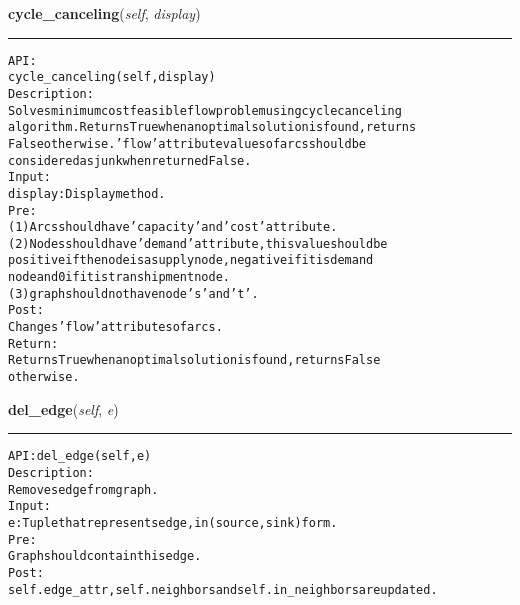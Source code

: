     \label{coinor:gimpy:graph:Graph:cycle_canceling}

    \vspace{0.5ex}

\hspace{.8\funcindent}\begin{boxedminipage}{\funcwidth}

    \raggedright \textbf{cycle\_canceling}(\textit{self}, \textit{display})

    \vspace{-1.5ex}

    \rule{\textwidth}{0.5\fboxrule}
\setlength{\parskip}{2ex}
\begin{alltt}

API:
    cycle\_canceling(self, display)
Description:
    Solves minimum cost feasible flow problem using cycle canceling
    algorithm. Returns True when an optimal solution is found, returns
    False otherwise. 'flow' attribute values of arcs should be
    considered as junk when returned False.
Input:
    display: Display method.
Pre:
    (1) Arcs should have 'capacity' and 'cost' attribute.
    (2) Nodes should have 'demand' attribute, this value should be
    positive if the node is a supply node, negative if it is demand
    node and 0 if it is transhipment node.
    (3) graph should not have node 's' and 't'.
Post:
    Changes 'flow' attributes of arcs.
Return:
    Returns True when an optimal solution is found, returns False
    otherwise.
\end{alltt}

\setlength{\parskip}{1ex}
    \end{boxedminipage}

    \label{coinor:gimpy:graph:Graph:del_edge}

    \vspace{0.5ex}

\hspace{.8\funcindent}\begin{boxedminipage}{\funcwidth}

    \raggedright \textbf{del\_edge}(\textit{self}, \textit{e})

    \vspace{-1.5ex}

    \rule{\textwidth}{0.5\fboxrule}
\setlength{\parskip}{2ex}
\begin{alltt}

API: del\_edge(self, e)
Description:
Removes edge from graph.
Input:
    e: Tuple that represents edge, in (source,sink) form.
Pre:
    Graph should contain this edge.
Post:
    self.edge\_attr, self.neighbors and self.in\_neighbors are updated.
\end{alltt}

\setlength{\parskip}{1ex}
    \end{boxedminipage}

